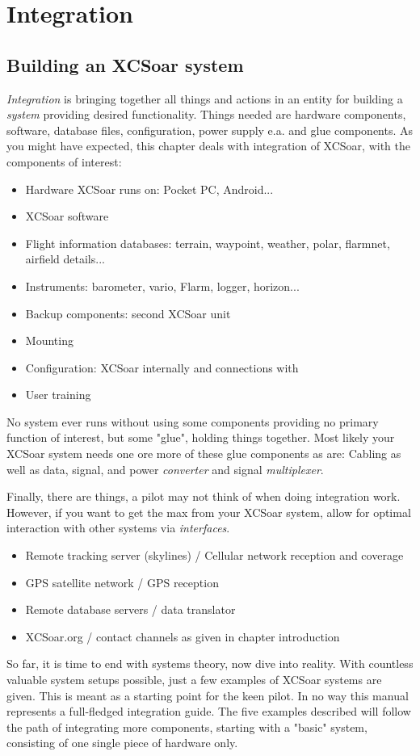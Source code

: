 \chapter{Integration}\label{cha:Integration}

\section{Building an XCSoar system}
\emph{Integration} is bringing together all things and actions in an entity for  
building a \emph{system} providing desired functionality. Things needed are 
hardware components, software, database files, configuration, power supply e.a. 
and glue components. As you might have expected, this chapter deals with 
integration of XCSoar, with the components of interest:
\begin{itemize} 
\item Hardware XCSoar runs on: Pocket PC, Android...
\item XCSoar software
\item Flight information databases: terrain, waypoint, weather, polar, 
flarmnet, airfield details...
\item Instruments: barometer, vario, Flarm, logger, horizon...
\item Backup components: second XCSoar unit
\item Mounting
\item Configuration: XCSoar internally and connections with
\item User training
\end{itemize}
No system ever runs without using some components providing no primary function 
of interest, but some "glue", holding things together.  Most likely your XCSoar 
system needs one ore more of these glue components as are:
Cabling as well as data, signal, and power \emph{converter} and signal 
\emph{multiplexer}.

Finally, there are things, a pilot may not think of when doing integration work. 
However, if you want to get the max from your XCSoar system, allow for optimal 
interaction with other systems via \emph{interfaces}.
\begin{itemize}
\item Remote tracking server (skylines) / Cellular network reception and coverage
\item GPS satellite network / GPS reception
\item Remote database servers / data translator
\item XCSoar.org / contact channels as given in chapter introduction
\end{itemize}
So far, it is time to end with systems theory, now dive into reality. With 
countless valuable system setups possible, just a few examples of XCSoar systems 
are given. This is meant as a starting point for the 
keen pilot. In no way this manual represents a full-fledged integration guide.  
The five examples described will follow the path of integrating more components, 
starting with a "basic" system, consisting of one single piece of hardware only.

